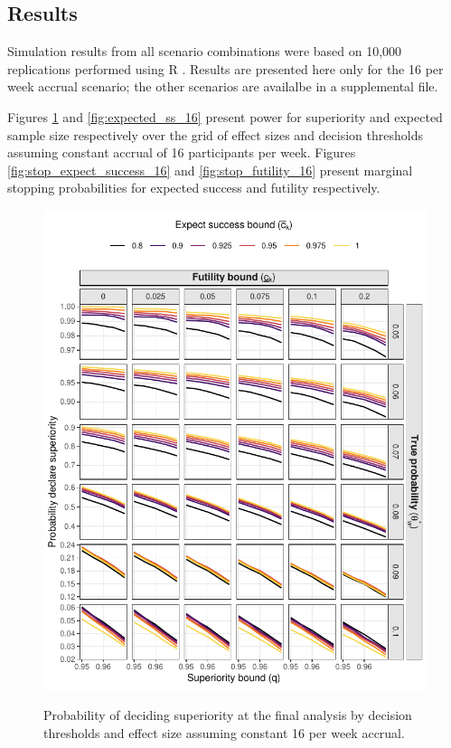 \documentclass{bmcart}
\begin{document}
\subsection*{Results}

Simulation results from all scenario combinations were based on 10,000 replications performed using R \cite{Rlang}.
Results are presented here only for the 16 per week accrual scenario; the other scenarios are availalbe in a supplemental file.

Figures \ref{fig:superiority_16} and \ref{fig:expected_ss_16} present power for superiority and expected sample size respectively over the grid of effect sizes and decision thresholds assuming constant accrual of 16 participants per week.
Figures \ref{fig:stop_expect_success_16} and \ref{fig:stop_futility_16} present marginal stopping probabilities for expected success and futility respectively.

\begin{figure}[!ht]
	\caption{Probability of deciding superiority at the final analysis by decision thresholds and effect size assuming constant 16 per week accrual.}
	\includegraphics{figures/superiority_16.pdf}
	\label{fig:superiority_16}
\end{figure}
\end{document}
